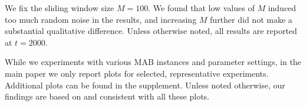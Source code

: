 \documentclass[../competing_bandits.tex]{subfiles}
\begin{document}
We fix the sliding window size $M = 100$. We found that low values of $M$ induced too much random noise in the results, and increasing $M$ further did not make a substantial qualitative difference. Unless otherwise noted, all results are reported at $t = 2000$. 

While we experiments with various MAB instances and parameter settings, in the main paper we only report plots for selected, representative experiments. Additional plots can be found in the supplement. Unless noted otherwise, our findings are based on and consistent with all these plots.
\end{document}
